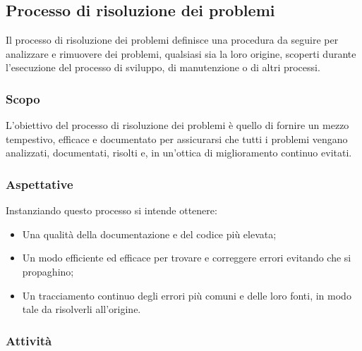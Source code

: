 \subsection{Processo di risoluzione dei problemi}
	
	Il processo di risoluzione dei problemi definisce una procedura da seguire per analizzare e rimuovere dei problemi, qualsiasi sia la loro origine, scoperti durante l'esecuzione del processo di sviluppo, di manutenzione o di altri processi.
	
	\subsubsection{Scopo}
		L'obiettivo del processo di risoluzione dei problemi è quello di fornire un mezzo tempestivo, efficace e documentato per assicurarsi che tutti i problemi vengano analizzati, documentati, risolti e, in un'ottica di miglioramento continuo evitati.	
	
	\subsubsection{Aspettative}
		Instanziando questo processo si intende ottenere:
		\begin{itemize}
		 	\item Una qualità della documentazione e del codice più elevata;
		 	\item Un modo efficiente ed efficace per trovare e correggere errori evitando che si propaghino;
		 	\item Un tracciamento continuo degli errori più comuni e delle loro fonti, in modo tale da risolverli all'origine.
		 \end{itemize} 
	\subsubsection{Attività}
